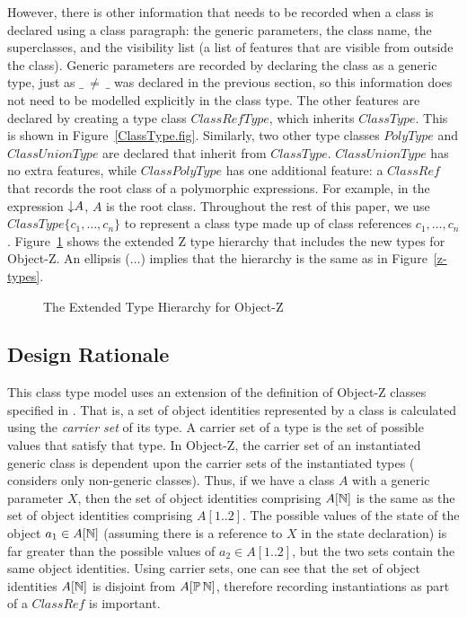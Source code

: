 However, there is other information that needs to be recorded when a
class is declared using a class paragraph: the generic parameters, the
class name, the superclasses, and the visibility list (a list of
features that are visible from outside the class). Generic parameters
are recorded by declaring the class as a generic type, just as
$\_~\neq~\_$ was declared in the previous section, so this information
does not need to be modelled explicitly in the class type. The other
features are declared by creating a type class $ClassRefType$, which
inherits $ClassType$. This is shown in
Figure~\ref{ClassType.fig}. Similarly, two other type classes
$PolyType$ and $ClassUnionType$ are declared that inherit from
$ClassType$. $ClassUnionType$ has no extra features, while
$ClassPolyType$ has one additional feature: a $ClassRef$ that records
the root class of a polymorphic expressions. For example, in the
expression $\mathord\downarrow A$, $A$ is the root class. Throughout the rest of
this paper, we use $ClassType\{c_1, \ldots, c_n\}$ to represent a
class type made up of class references $c_1, \ldots, c_n$.
Figure~\ref{oz-types}
shows the extended Z type hierarchy that includes the new types for
Object-Z. An ellipsis ($\ldots$) implies that the hierarchy is the
same as in Figure~\ref{z-types}.

\def\epsfsize#1#2{0.7#1}
\begin{figure}
\begin{center}
\end{center}
\caption{The Extended Type Hierarchy for Object-Z}
\label{oz-types}
\end{figure}
\def\epsfsize#1#2{\epsfxsize}

\subsection{Design Rationale}

This class type model uses an extension of the definition of Object-Z
classes specified in \cite{griffiths94}. That is, a set of object
identities represented by a class is calculated using the {\em carrier
set} of its type. A carrier set of a type is the set of possible
values that satisfy that type. In Object-Z, the carrier set of an
instantiated generic class is dependent upon the carrier sets of the
instantiated types (\cite{griffiths94} considers only non-generic
classes). Thus, if we have a class $A$ with a generic parameter $X$,
then the set of object identities comprising $A[{\mathbb N}]$ is the same as
the set of object identities comprising $A[1..2]$. The possible values
of the state of the object $a_1 \in A[{\mathbb N}]$ (assuming there is a
reference to $X$ in the state declaration) is far greater than the
possible values of $a_2 \in A[1..2]$, but the two sets contain the
same object identities. Using carrier sets, one can see that the set
of object identities $A[{\mathbb N}]$ is disjoint from $A[\power
\nat]$, therefore recording instantiations as part of a $ClassRef$
is important.

